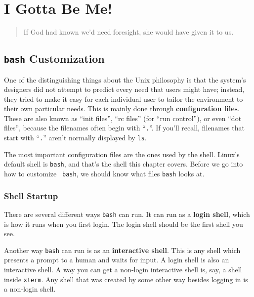 
\chapter{I Gotta Be Me!}\label{configuration-chapter}

\begin{quote}
  If God had known we'd need foresight, she would have given it to us.
\end{quote}

\section{{\tt bash} Customization}

One of the distinguishing things about the Unix philosophy is that the
system's designers did not attempt to predict every need that users
might have; instead, they tried to make it easy for each individual
user to tailor the environment to their own particular needs.  This is
mainly done through {\bf configuration files}. These are also known as ``init files'',
``rc files'' (for ``run control''), or even ``dot
files'', because the filenames often begin with ``{\tt .}''. If you'll
recall, filenames that start with ``{\tt .}'' aren't normally
displayed by {\tt ls}.

The most important configuration files are the ones used by the shell.
Linux's default shell is {\tt bash}, and that's the
shell this chapter covers. Before we go into how to customize {\tt
  bash}, we should know what files {\tt bash} looks at.

\subsection{Shell Startup}

There are several different ways {\tt bash} can run. It can run as a
{\bf login shell}, which is how it runs when you
first login. The login shell should be the first shell you see.

Another way {\tt bash} can run is as an {\bf interactive
  shell}. This is any shell which presents a
prompt to a human and waits for input. A login shell is also an
interactive shell. A way you can get a non-login interactive shell is,
say, a shell inside {\tt xterm}. Any shell that
was created by some other way besides logging in is a non-login shell.

